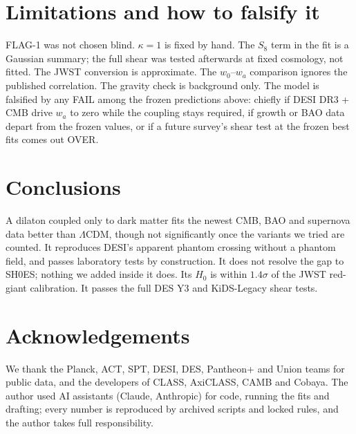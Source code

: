 \documentclass[11pt]{article}
\begin{document}
\section{Limitations and how to falsify it}
FLAG-1 was not chosen blind. $\kappa=1$ is fixed by hand. The $S_8$ term in the fit is a Gaussian summary; the full shear was tested afterwards at fixed cosmology, not fitted. The
JWST conversion is approximate. The $w_0$--$w_a$ comparison ignores the published correlation. The gravity check is
background only. The model is falsified by any FAIL among the frozen predictions above: chiefly if DESI DR3 + CMB drive $w_a$ to zero
while the coupling stays required, if growth or BAO data depart from the frozen values, or if a future survey's shear
test at the frozen best fits comes out OVER.

\section{Conclusions}
A dilaton coupled only to dark matter fits the newest CMB, BAO and supernova data better than $\Lambda$CDM, though not
significantly once the variants we tried are counted. It reproduces
DESI's apparent phantom crossing without a phantom field, and passes laboratory tests by construction. It does not
resolve the gap to SH0ES; nothing we added inside it does. Its $H_0$ is within $1.4\sigma$ of the JWST red-giant
calibration. It passes the full DES Y3 and KiDS-Legacy shear tests.

\section*{Acknowledgements}
We thank the Planck, ACT, SPT, DESI, DES, Pantheon+ and Union teams for public data, and the developers of CLASS,
AxiCLASS, CAMB and Cobaya. The author used AI assistants (Claude, Anthropic) for code, running the fits and drafting;
every number is reproduced by archived scripts and locked rules, and the author takes full responsibility.
\end{document}
